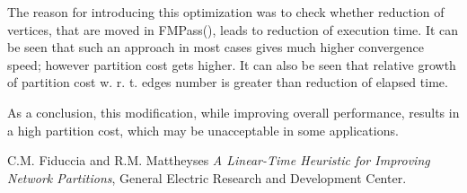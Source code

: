 \documentclass[12pt,a4paper,twocolumn]{article}
\begin{document}
	The reason for introducing this optimization was to check whether reduction of vertices, that are moved in FMPass(), leads to reduction of execution time. It can be seen that such an approach in most cases gives much higher convergence speed; however partition cost gets higher. It can also be seen that relative growth of partition cost w. r. t. edges number is greater than reduction of elapsed time.
	
	As a conclusion, this modification, while improving overall performance, results in a high partition cost, which may be unacceptable in some applications.
	
	\begin{thebibliography}{9}
		 C.M. Fiduccia and R.M. Mattheyses \textit{A Linear-Time Heuristic for Improving Network Partitions}, General Electric Research and Development Center.
		
	\end{thebibliography}
	
\end{document}
